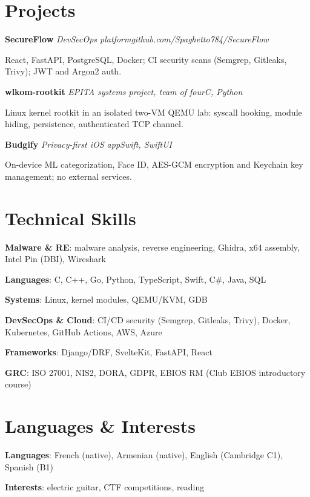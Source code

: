 \documentclass[10pt]{article}
\newcommand{\gap}{\vspace{4pt}}
\begin{document}
\section{Projects}
\textbf{SecureFlow} \textbar{} \textit{DevSecOps platform}\hfill\textit{github.com/Spaghetto784/SecureFlow}\par
React, FastAPI, PostgreSQL, Docker; CI security scans (Semgrep, Gitleaks, Trivy); JWT and Argon2 auth.\gap\par
\textbf{wlkom-rootkit} \textbar{} \textit{EPITA systems project, team of four}\hfill\textit{C, Python}\par
Linux kernel rootkit in an isolated two-VM QEMU lab: syscall hooking, module hiding, persistence, authenticated TCP channel.\gap\par
\textbf{Budgify} \textbar{} \textit{Privacy-first iOS app}\hfill\textit{Swift, SwiftUI}\par
On-device ML categorization, Face ID, AES-GCM encryption and Keychain key management; no external services.

\section{Technical Skills}
\textbf{Malware \& RE}: malware analysis, reverse engineering, Ghidra, x64 assembly, Intel Pin (DBI), Wireshark\par
\textbf{Languages}: C, C++, Go, Python, TypeScript, Swift, C\#, Java, SQL\par
\textbf{Systems}: Linux, kernel modules, QEMU/KVM, GDB\par
\textbf{DevSecOps \& Cloud}: CI/CD security (Semgrep, Gitleaks, Trivy), Docker, Kubernetes, GitHub Actions, AWS, Azure\par
\textbf{Frameworks}: Django/DRF, SvelteKit, FastAPI, React\par
\textbf{GRC}: ISO 27001, NIS2, DORA, GDPR, EBIOS RM (Club EBIOS introductory course)

\section{Languages \& Interests}
\textbf{Languages}: French (native), Armenian (native), English (Cambridge C1), Spanish (B1)\par
\textbf{Interests}: electric guitar, CTF competitions, reading
\end{document}
